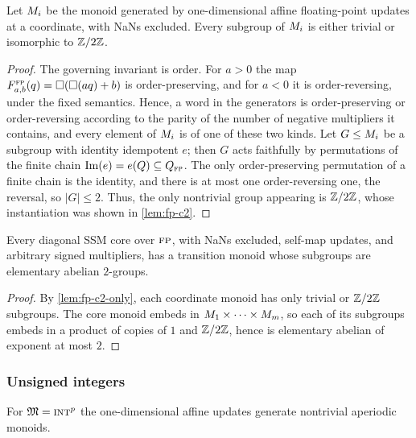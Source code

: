 \documentclass{article}
\begin{document}
\begin{lemma}\label{lem:fp-c2-only}
Let $M_i$ be the monoid generated by one-dimensional affine floating-point updates at a coordinate, with NaNs excluded.
Every subgroup of $M_i$ is either trivial or isomorphic to $\mathbb{Z}/{2}\mathbb{Z}$.
\end{lemma}

\begin{proof}
The governing invariant is order.
For $a > 0$ the map $F_{a,b}^{\textsc{fp}}(q) = \square(\square(aq) + b)$ is order-preserving, and for $a < 0$ it is order-reversing, under the fixed semantics.
Hence, a word in the generators is order-preserving or order-reversing according to the parity of the number of negative multipliers it contains, and every element of $M_i$ is of one of these two kinds.
Let $G \le M_i$ be a subgroup with identity idempotent $e$; then $G$ acts faithfully by permutations of the finite chain $\mathop{\mathrm{Im}}(e) = e(Q) \subseteq Q_{\textsc{fp}}$.
The only order-preserving permutation of a finite chain is the identity, and there is at most one order-reversing one, the reversal, so $|G| \le 2$. 
Thus, the only nontrivial group appearing is $\mathbb{Z}/{2}\mathbb{Z}$, whose instantiation was shown in \cref{lem:fp-c2}. 
\end{proof}

\begin{corollary}\label{cor:fp-ab2}
Every diagonal SSM core over $\textsc{fp}$, with NaNs excluded, self-map updates, and arbitrary signed multipliers, has a transition monoid whose subgroups are elementary abelian $2$-groups.
\end{corollary}

\begin{proof}
By \cref{lem:fp-c2-only}, each coordinate monoid has only trivial or $\mathbb{Z}/{2}\mathbb{Z}$ subgroups.
The core monoid embeds in $M_1 \times \cdots \times M_m$, so each of its subgroups embeds in a product of copies of $1$ and $\mathbb{Z}/{2}\mathbb{Z}$, hence is elementary abelian of exponent at most $2$.
\end{proof}

\subsubsection{Unsigned integers}

\begin{lemma}\label{lem:wrap-aperiodic}
For $\mathfrak{M} = \textsc{int}^p$ the one-dimensional affine updates generate nontrivial aperiodic monoids.
\end{lemma}
\end{document}
